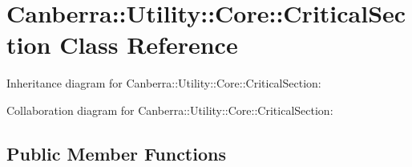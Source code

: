 \hypertarget{class_canberra_1_1_utility_1_1_core_1_1_critical_section}{}\section{Canberra\+:\+:Utility\+:\+:Core\+:\+:Critical\+Section Class Reference}
\label{class_canberra_1_1_utility_1_1_core_1_1_critical_section}


Inheritance diagram for Canberra\+:\+:Utility\+:\+:Core\+:\+:Critical\+Section\+:


Collaboration diagram for Canberra\+:\+:Utility\+:\+:Core\+:\+:Critical\+Section\+:
\subsection*{Public Member Functions}
